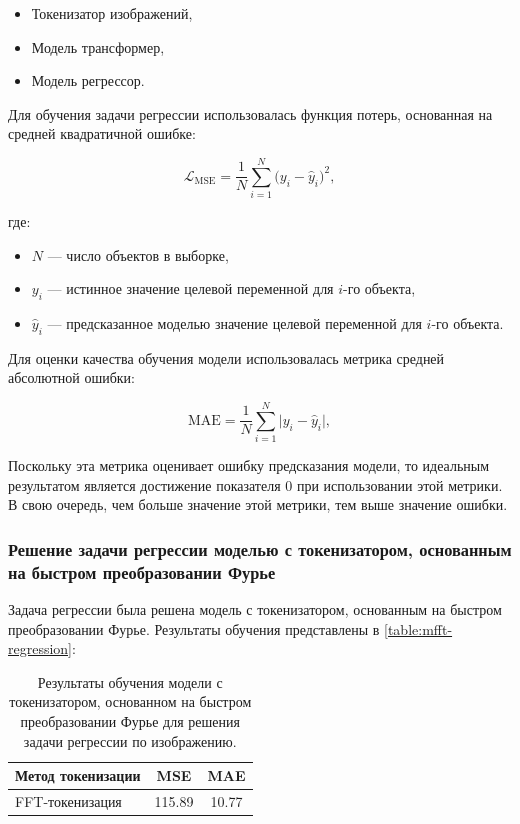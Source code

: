 \begin{itemize}
    \item Токенизатор изображений,
    \item Модель трансформер,
    \item Модель регрессор.
\end{itemize}

Для обучения задачи регрессии использовалась функция потерь, основанная на средней квадратичной ошибке:

$$
\mathcal{L}_{\mathrm{MSE}} = \frac{1}{N} \sum_{i=1}^{N} \bigl(y_i - \hat{y}_i\bigr)^2,
$$

где: 

\begin{itemize}
  \item $N$ — число объектов в выборке,
  \item $y_i$ — истинное значение целевой переменной для $i$-го объекта,
  \item $\hat{y}_i$ — предсказанное моделью значение целевой переменной для $i$-го объекта.
\end{itemize}

Для оценки качества обучения модели использовалась метрика средней абсолютной ошибки:

$$
\mathrm{MAE} = \frac{1}{N} \sum_{i=1}^{N} \bigl|y_i - \hat{y}_i\bigr|,
$$

Поскольку эта метрика оценивает ошибку предсказания модели, то идеальным результатом является достижение показателя 0 при использовании этой метрики. В свою очередь, чем больше значение этой метрики, тем выше значение ошибки.

\subsubsection{Решение задачи регрессии моделью с токенизатором, основанным на быстром преобразовании Фурье}

Задача регрессии была решена модель с токенизатором, основанным на быстром преобразовании Фурье. Результаты обучения представлены в \autoref{table:mfft-regression}:

\begin{table}[H]
  \centering
  \begin{tabular}{|l|c|c|}
    \hline
    Метод токенизации & MSE & MAE \\ \hline
    FFT-токенизация & 115.89 & 10.77 \\
    \hline
  \end{tabular}
  \caption{Результаты обучения модели с токенизатором, основанном на быстром преобразовании Фурье для решения задачи регрессии по изображению.}
  \label{table:mfft-regression}
\end{table}

